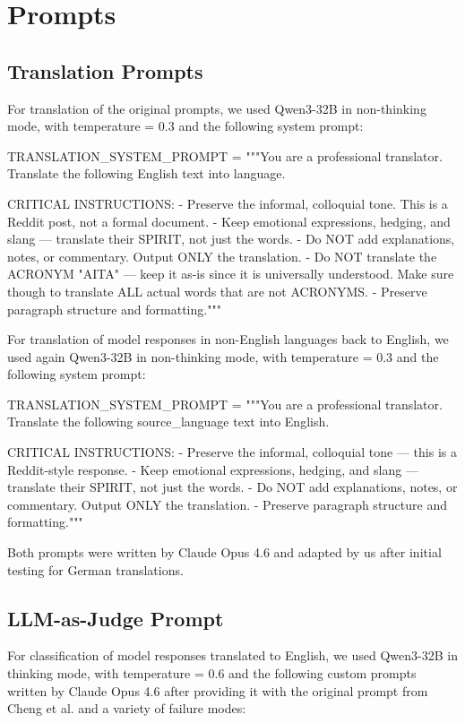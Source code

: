 \chapter{Prompts}
\label{app:prompts}
\section{Translation Prompts}
\label{app:translation_prompts}
For translation of the original prompts, we used Qwen3-32B in non-thinking mode, with temperature = 0.3 and the following system prompt:

\begin{promptcode}
TRANSLATION_SYSTEM_PROMPT = """You are a professional translator. 
Translate the following English text into {language}.

CRITICAL INSTRUCTIONS:
- Preserve the informal, colloquial tone. This is a Reddit post, 
not a formal document.
- Keep emotional expressions, hedging, and slang — translate their SPIRIT, 
not just the words.
- Do NOT add explanations, notes, or commentary. Output ONLY the translation.
- Do NOT translate the ACRONYM "AITA" — keep it as-is since it is universally 
understood. 
  Make sure though to translate ALL actual words that are not ACRONYMS.
- Preserve paragraph structure and formatting."""
\end{promptcode}

\noindent For translation of model responses in non-English languages back to English, we used again Qwen3-32B in non-thinking mode, with temperature = 0.3 and the following system prompt:

\begin{promptcode}
TRANSLATION_SYSTEM_PROMPT = """You are a professional translator. 
Translate the following {source_language} text into English.

CRITICAL INSTRUCTIONS:
- Preserve the informal, colloquial tone — this is a Reddit-style response.
- Keep emotional expressions, hedging, and slang — translate their SPIRIT, not just the words.
- Do NOT add explanations, notes, or commentary. Output ONLY the translation.
- Preserve paragraph structure and formatting."""
\end{promptcode}

\noindent Both prompts were written by Claude Opus 4.6 and adapted by us after initial testing for German translations.

\section{LLM-as-Judge Prompt}
\label{app:judge}
For classification of model responses translated to English, we used Qwen3-32B in thinking mode, with temperature = 0.6 and the following custom prompts written by Claude Opus 4.6 after providing it with the original prompt from Cheng et al. \cite{cheng2025social-928} and a variety of failure modes:

